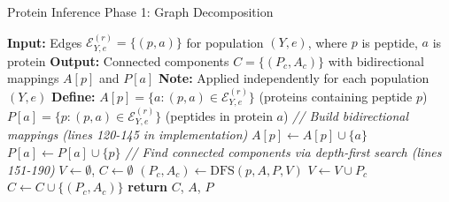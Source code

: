 \documentclass{article}
\begin{document}
\begin{algorithm}[t]
\caption{Protein Inference Phase 1: Graph Decomposition}
\begin{algorithmic}[1]
\State \textbf{Input:} Edges $\mathcal{E}^{(r)}_{Y,e} = \{(p, a)\}$ for population $(Y, e)$, where $p$ is peptide, $a$ is protein
\State \textbf{Output:} Connected components $C = \{(P_c, A_c)\}$ with bidirectional mappings $A[p]$ and $P[a]$
\State \textbf{Note:} Applied independently for each population $(Y, e)$
\State \textbf{Define:} $A[p] = \{a : (p, a) \in \mathcal{E}^{(r)}_{Y,e}\}$ (proteins containing peptide $p$)
\State \hspace{2.3em} $P[a] = \{p : (p, a) \in \mathcal{E}^{(r)}_{Y,e}\}$ (peptides in protein $a$)
\State
\State \textit{// Build bidirectional mappings (lines 120-145 in implementation)}
    \State $A[p] \gets A[p] \cup \{a\}$ 
    \State $P[a] \gets P[a] \cup \{p\}$ 
\EndFor
\State
\State \textit{// Find connected components via depth-first search (lines 151-190)}
\State $V \gets \emptyset$, $C \gets \emptyset$ 
        \State $(P_c, A_c) \gets \text{DFS}(p, A, P, V)$ 
        \State $V \gets V \cup P_c$ 
        \State $C \gets C \cup \{(P_c, A_c)\}$
    \EndIf
\EndFor
\State
\State \textbf{return} $C$, $A$, $P$
\end{algorithmic}
\end{algorithm}
\end{document}
